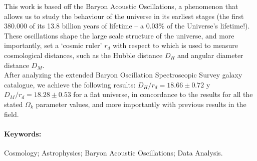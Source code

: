 This work is based off the Baryon Acoustic Oscillations, a phenomenon that allows us to study the behaviour of the universe in its earliest stages (the first 380.000 of its 13.8 billion years of lifetime -- a 0.03\% of the Universe's lifetime!). These oscillations shape the large scale structure of the universe, and more importantly, set a `cosmic ruler' $r_d$ with respect to which is used to measure cosmological distances, such as the Hubble distance $D_H$ and angular diameter distance $D_M$.\\

After analyzing the extended Baryon Oscillation Spectroscopic Survey galaxy catalogue, we achieve the following results: $D_H/r_d = 18.66\pm 0.72$ y $D_M/r_d = 18.28\pm 0.53$ for a flat universe, in concordance to the results for all the stated  $\Omega_k$ parameter values, and more importantly with previous results in the field.





\paragraph{Keywords:} Cosmology; Astrophysics; Baryon Acoustic Oscillations; Data Analysis.
